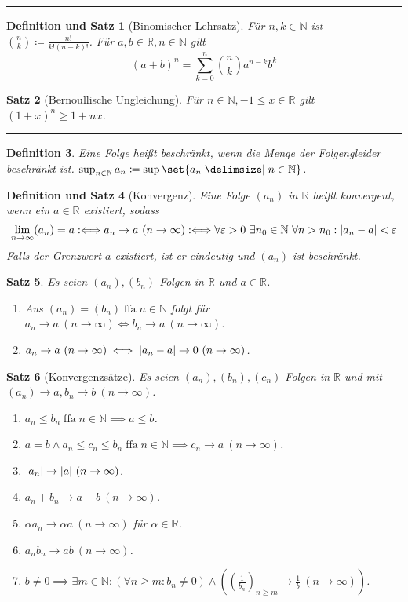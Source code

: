 \documentclass[a4paper]{article}
\newcounter{Sec}
\theoremstyle{marginbreak}
\newtheorem{definition}{Definition}[Sec]
\newtheorem{satz}[definition]{Satz}
\newtheorem{defsatz}[definition]{Definition und Satz}
\DeclareMathOperator{\ffa}{ffa}
\newcommand{\sep}{%
	\rule{\textwidth}{0.3pt}%
	\stepcounter{Sec}%
	}
\newcommand{\defiff}{:\Longleftrightarrow}
\newcommand{\en}{~(n\to\infty)}
\begin{document}
	\sep
	\begin{defsatz}[Binomischer Lehrsatz]
		Für $n, k\in\mathbb{N}$ ist $\binom{n}{k}\coloneqq\frac{n!}{k!(n-k)!}$.
		Für $a, b\in\mathbb{R}, n\in\mathbb{N}$ gilt
		\[(a+b)^n = \sum_{k=0}^n\binom{n}{k}a^{n-k}b^k\]
	\end{defsatz}
	\begin{satz}[Bernoullische Ungleichung]
		Für $n\in\mathbb{N}, -1\leq x\in\mathbb{R}$ gilt $(1+x)^n\geq1+nx$.
	\end{satz}
	\sep
	\begin{definition}
		Eine Folge heißt beschränkt, wenn die Menge der Folgengleider beschränkt
		ist. $\sup_{n\in\mathbb{N}}a_n\coloneqq\sup\set{a_n\given n\in\mathbb{N}}$.
	\end{definition}
	\begin{defsatz}[Konvergenz]
		Eine Folge $(a_n)$ in $\mathbb{R}$ heißt konvergent, wenn ein $a\in\mathbb{R}$ existiert, sodass
		\[\lim_{n\to\infty}(a_n) = a \defiff a_n\to a\en \defiff
			\forall\varepsilon>0~\exists n_0\in\mathbb{N}~\forall n>n_0:\abs{a_n-a}<\varepsilon\]
		Falls der Grenzwert $a$ existiert, ist er eindeutig und $(a_n)$ ist beschränkt.
	\end{defsatz}
	\begin{satz}
		Es seien $(a_n), (b_n)$ Folgen in $\mathbb{R}$ und $a\in\mathbb{R}$.
		\begin{enumerate}[label=(\alph*)]
			\item Aus $(a_n) = (b_n) \ffa n\in\mathbb{N}$ folgt für $a_n\to a\en \iff b_n\to a\en$.
			\item $a_n\to a\en \iff \abs{a_n-a}\to0\en$.
		\end{enumerate}
	\end{satz}
	\begin{satz}[Konvergenzsätze]
		Es seien $(a_n), (b_n), (c_n)$ Folgen in $\mathbb{R}$ und mit $(a_n)\to a,b_n\to b\en$.
		\begin{enumerate}[label=(\alph*)]
			\item $a_n\leq b_n\ffa n\in\mathbb{N}\implies a\leq b$.
			\item $a=b\wedge a_n\leq c_n\leq b_n\ffa n\in\mathbb{N}\implies c_n\to a\en$.
			\item $\abs{a_n}\to\abs{a}\en$.
			\item $a_n+b_n\to a+b\en$.
			\item $\alpha a_n\to\alpha a\en$ für $\alpha\in\mathbb{R}$.
			\item $a_n b_n\to ab\en$.
			\item $b\neq0\implies \exists m\in\mathbb{N}: (\forall n\geq m: b_n\neq0) \wedge ((\frac{1}{b_n})_{n\geq m}\to\frac{1}{b}\en)$.
		\end{enumerate}
	\end{satz}
\end{document}
